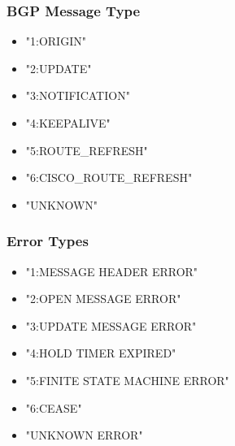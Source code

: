 \documentclass{article}
\begin{document}
\subsubsection{BGP Message Type}
\begin{itemize}
\item{"1:ORIGIN"}
\item{"2:UPDATE"}
\item{"3:NOTIFICATION"}
\item{"4:KEEPALIVE"}
\item{"5:ROUTE_REFRESH"}
\item{"6:CISCO_ROUTE_REFRESH"}
\item{"UNKNOWN"}
\end{itemize}

\subsubsection{Error Types}
\begin{itemize}
\item{"1:MESSAGE HEADER ERROR"}
\item{"2:OPEN MESSAGE ERROR"}
\item{"3:UPDATE MESSAGE ERROR"}
\item{"4:HOLD TIMER EXPIRED"}
\item{"5:FINITE STATE MACHINE ERROR"}
\item{"6:CEASE"}
\item{"UNKNOWN ERROR"}
\end{itemize}
\end{document}
